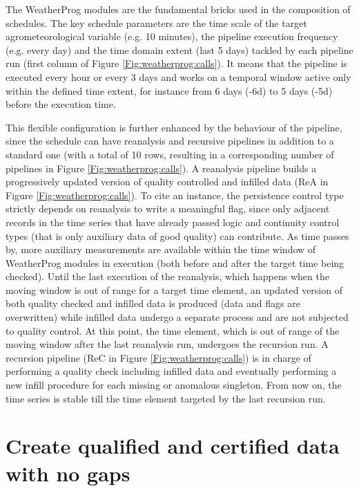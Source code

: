 \documentclass[authoryear,preprint,review,12pt]{elsarticle}
\newcommand{\note}[1]{\emph{\textcolor{red}{#1}}}
\begin{document}
The WeatherProg modules are the fundamental bricks used in the composition of schedules.
The key schedule parameters are the time scale of the target agrometeorological variable (e.g. 10 minutes), the pipeline execution frequency (e.g. every day) and the time domain extent (last 5 days) tackled by each pipeline run (first column of Figure \ref{Fig:weatherprog:calls}).
It means that the pipeline is executed every hour or every 3 days and works on a temporal window active only within the defined time extent, for instance from 6 days (-6d) to 5 days (-5d) before the execution time.

This flexible configuration is further enhanced by the behaviour of the pipeline, since the schedule can have reanalysis and recursive pipelines in addition to a standard one (with a total of 10 rows, resulting in a corresponding number of pipelines in Figure \ref{Fig:weatherprog:calls}).
A reanalysis pipeline builds a progressively updated version of quality controlled and infilled data (ReA in Figure \ref{Fig:weatherprog:calls}).
To cite an instance, the persistence control type strictly depends on reanalysis to write a meaningful flag, since only adjacent records in the time series that have already passed logic and continuity control types (that is only auxiliary data of good quality) can contribute. %
As time passes by, more auxiliary measurements are available within the time window of WeatherProg modules in execution (both before and after the target time being checked). 
Until the last execution of the reanalysis, which happens when the moving window is out of range for a target time element, an updated version of both quality checked and infilled data is produced (data and flags are overwritten) while infilled data undergo a separate process and are not subjected to quality control.
At this point, the time element, which is out of range of the moving window after the last reanalysis run, undergoes the recursion run.
A recursion pipeline (ReC in Figure \ref{Fig:weatherprog:calls}) is in charge of performing a quality check including infilled data and eventually performing a new infill procedure for each missing or anomalous singleton.
From now on, the time series is stable till the time element targeted by the last recursion run.

\section{Create qualified and certified data with no gaps} \label{sec:qck+fill}
\end{document}
